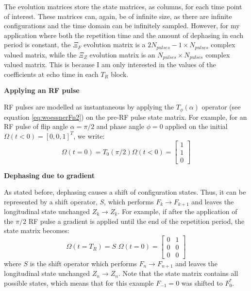 The evolution matrices store the state matrices, as columns, for each time point of interest.
These matrices can, again, be of infinite size, as there are infinite configurations and the time domain can be infinitely sampled.
However, for my application where both the repetition time and the amount of dephasing in each period is constant, the $\Xi_F$ evolution matrix is a $2N_{pulses}-1 \times N_{pulses}$ complex valued matrix, while the $\Xi_Z$ evolution matrix is an $N_{pulses} \times N_{pulses}$ complex valued matrix.
This is because I am only interested in the values of the coefficients at echo time in each $T_R$ block.

\hfill

\textbf{Applying an RF pulse}

RF pulses are modelled as instantaneous by applying the $T_{\phi}(\alpha)$ operator (see equation \ref{eq:woessnerFn2}) on the pre-RF pulse state matrix.
For example, for an RF pulse of flip angle $\alpha = \pi/2$ and phase angle $\phi = 0$ applied on the initial $\Omega (t < 0) = [0, 0, 1]^T$, we write:
\begin{equation}
    \Omega (t = 0) = T_0(\pi/2) \Omega (t < 0) = 
    \begin{bmatrix} 
        1 \\
        1 \\
        0
    \end{bmatrix}
\end{equation}

\hfill

\textbf{Dephasing due to gradient}

As stated before, dephasing causes a shift of configuration states.
Thus, it can be represented by a shift operator, $S$, which performs $F_k \rightarrow F_{k+1}$ and leaves the longitudinal state unchanged $Z_k \rightarrow Z_k$. 
For example, if after the application of the $\pi/2$ RF pulse a gradient is applied until the end of the repetition period, the state matrix becomes:
\begin{equation}
    \Omega (t = T_R) = S \, \, \Omega (t = 0) = 
    \begin{bmatrix} 
        0 & 1\\
        0 & 0\\
        0 & 0
    \end{bmatrix}
\end{equation}
where $S$ is the shift operator which performs $F_n \rightarrow F_{n+1}$ and leaves the longitudinal state unchanged $Z_n \rightarrow Z_n$. 
Note that the state matrix contains all possible states, which means that for this example $F_{-1} = 0$ was shifted to $F_0^*$.


